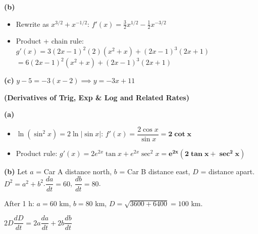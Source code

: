 \documentclass[addpoints]{exam}
\begin{document}
\begin{questions}
\begin{solution}[10cm]
\textbf{(b)}
\begin{itemize}
    \item[(i)] Rewrite as $x^{3/2}+x^{-1/2}$:\quad
    $f'(x) = \tfrac{3}{2}x^{1/2} - \tfrac{1}{2}x^{-3/2}$
    \item[(ii)] Product + chain rule:
    $g'(x) = 3(2x-1)^2(2)(x^2+x) + (2x-1)^3(2x+1)$
    $= 6(2x-1)^2(x^2+x) + (2x-1)^3(2x+1)$
\end{itemize}

\textbf{(c)} $y - 5 = -3(x-2) \implies \boxed{y = -3x + 11}$
\end{solution}

\question \textbf{(Derivatives of Trig, Exp \& Log and Related Rates)}
\begin{solution}[10cm]
\textbf{(a)}
\begin{itemize}
    \item[(i)] $\ln(\sin^2 x) = 2\ln|\sin x|$:\quad
    $f'(x) = \dfrac{2\cos x}{\sin x} = \mathbf{2\cot x}$
    \item[(ii)] Product rule:
    $g'(x) = 2e^{2x}\tan x + e^{2x}\sec^2 x = \mathbf{e^{2x}(2\tan x + \sec^2 x)}$
\end{itemize}

\textbf{(b)} Let $a$ = Car A distance north, $b$ = Car B distance east, $D$ = distance apart.
$D^2 = a^2 + b^2$.\quad $\dfrac{da}{dt} = 60$, $\dfrac{db}{dt} = 80$.

After 1 h: $a = 60$ km, $b = 80$ km, $D = \sqrt{3600+6400} = 100$ km.

$2D\dfrac{dD}{dt} = 2a\dfrac{da}{dt} + 2b\dfrac{db}{dt}$


\end{solution}
\end{questions}
\end{document}
